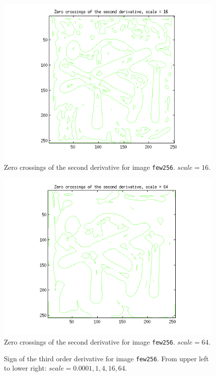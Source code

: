 \begin{figure}[H]
	\centering
	\includegraphics[scale=0.8]{./images/Q5/vv/16.png}
	\caption{Zero crossings of the second derivative for image \texttt{few256}. $scale = 16$.}
	\label{fig:Q5_vv_16}
\end{figure}

\begin{figure}[H]
	\centering
	\includegraphics[scale=0.8]{./images/Q5/vv/64.png}
	\caption{Zero crossings of the second derivative for image \texttt{few256}. $scale = 64$.}
	\label{fig:Q5_vv_64}
\end{figure}


\begin{figure}[H]
	\centering
	\scalebox{0.6}{}
	\caption{Sign of the third order derivative for image \texttt{few256}. From upper left to lower right: $scale = 0.0001, 1, 4, 16, 64$.}
	\label{fig:Q5_vvv_}
\end{figure}



